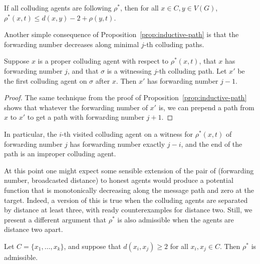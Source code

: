 \documentclass{comnet}
\begin{document}
\begin{corollary} \label{cor:rhostar-bound}

If all colluding agents are following $\rho^*$, then for all $x \in C, y \in
V(G)$, $\rho^*(x,t) \leq d(x,y) - 2 + \rho(y,t)$.

\end{corollary}

Another simple consequence of Proposition~\ref{prop:inductive-path} is that the
forwarding number decreases along minimal $j$-th colluding paths.

\begin{proposition} \label{prop:inductive-forwarding-number}

Suppose $x$ is a proper colluding agent with respect to $\rho^*(x,t)$, that $x$
has forwarding number $j$, and that $\sigma$ is a witnessing $j$-th colluding
path. Let $x'$ be the first colluding agent on $\sigma$ after $x$. Then $x'$
has forwarding number $j-1$.  

\end{proposition}

\begin{proof}

The same technique from the proof of Proposition~\ref{prop:inductive-path}
shows that whatever the forwarding number of $x'$ is, we can prepend a path from
$x$ to $x'$ to get a path with forwarding number $j+1$.
\end{proof}

In particular, the $i$-th visited colluding agent on a witness for
$\rho^*(x,t)$ of forwarding number $j$ has forwarding number exactly $j - i$,
and the end of the path is an improper colluding agent.

At this point one might expect some sensible extension of the pair of
(forwarding number, broadcasted distance) to honest agents would produce a
potential function that is monotonically decreasing along the message path and
zero at the target. Indeed, a version of this is true when the colluding agents
are separated by distance at least three, with ready counterexamples for
distance two. Still, we present a different argument that $\rho^*$ is also
admissible when the agents are distance two apart.

\begin{proposition} \label{prop:rhostar-admissible}

Let $C = \{ x_1, \dots, x_k \}$, and suppose that $d(x_i, x_j) \geq 2$ for all
$x_i, x_j \in C$. Then $\rho^*$ is admissible.

\end{proposition}
\end{document}
